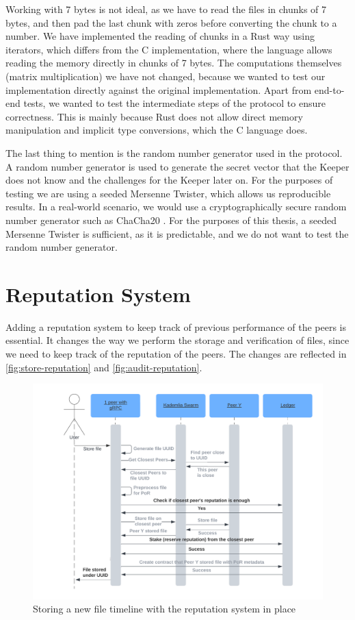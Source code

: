 Working with 7 bytes is not ideal, as we have to read the files in chunks of 7 bytes,
and then pad the last chunk with zeros before converting the chunk to a number.
We have implemented the reading of chunks in a Rust way using iterators,
which differs from the C implementation, where the language allows reading the memory directly in
chunks of 7 bytes.
The computations themselves (matrix multiplication) we have not changed,
because we wanted to test our implementation directly against the original implementation.
Apart from end-to-end tests, we wanted to test the intermediate steps of the protocol
to ensure correctness.
This is mainly because Rust does not allow direct memory manipulation and implicit type conversions,
which the C language does.

The last thing to mention is the random number generator used in the protocol.
A random number generator is used to generate the secret vector that the Keeper does not know
and the challenges for the Keeper later on.
For the purposes of testing we are using a seeded Mersenne Twister, which allows us reproducible results.
In a real-world scenario, we would use a cryptographically secure random number generator
such as ChaCha20 \cite{chacha}.
For the purposes of this thesis, a seeded Mersenne Twister is sufficient,
as it is predictable, and we do not want to test the random number generator.

\section{Reputation System}
\label{section:reputation-system}

Adding a reputation system to keep track of previous performance of the peers is essential.
It changes the way we perform the storage and verification of files,
since we need to keep track of the reputation of the peers.
The changes are reflected in \autoref{fig:store-reputation} and \autoref{fig:audit-reputation}.

\begin{figure}
    \centering
    \includegraphics[width=1\textwidth]{gfx/store-reputation.png}
    \caption{Storing a new file timeline with the reputation system in place}
    \label{fig:store-reputation}
\end{figure}

